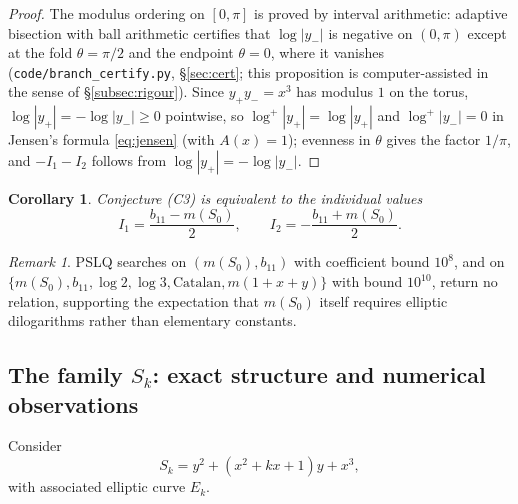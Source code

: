 \documentclass[11pt]{amsart}
\newtheorem{corollary}[theorem]{Corollary}
\theoremstyle{definition}
\theoremstyle{remark}
\newtheorem{remark}[theorem]{Remark}
\begin{document}
\begin{proof}
The modulus ordering on $[0,\pi]$ is proved by interval arithmetic:
adaptive bisection with ball arithmetic certifies that $\log|y_-|$ is
negative on $(0,\pi)$ except at the fold $\theta=\pi/2$ and the endpoint
$\theta=0$, where it vanishes (\texttt{code/branch\_certify.py},
\S\ref{sec:cert}; this proposition is computer-assisted in the sense of
\S\ref{subsec:rigour}). Since
$y_+y_-=x^3$ has modulus $1$ on the torus, $\log|y_+|=-\log|y_-|\ge 0$
pointwise, so $\log^+|y_+|=\log|y_+|$ and $\log^+|y_-|=0$ in Jensen's
formula \eqref{eq:jensen} (with $A(x)=1$); evenness in $\theta$ gives the
factor $1/\pi$, and $-I_1-I_2$ follows from $\log|y_+|=-\log|y_-|$.
\end{proof}

\begin{corollary}
Conjecture \emph{(C3)} is equivalent to the individual values
\[
  I_1=\frac{b_{11}-m(S_0)}{2},\qquad I_2=-\frac{b_{11}+m(S_0)}{2}.
\]
\end{corollary}

\begin{remark}
PSLQ searches on $(m(S_0),b_{11})$ with coefficient bound $10^8$, and on
$\{m(S_0),b_{11},\log2,\log3,\mathrm{Catalan},m(1+x+y)\}$ with bound
$10^{10}$, return no relation, supporting the expectation that $m(S_0)$
itself requires elliptic dilogarithms rather than elementary constants.
\end{remark}

\subsection{The family \texorpdfstring{$S_k$}{Sk}: exact structure and
numerical observations}
\label{subsec:familythm}

Consider
\[
  S_k=y^2+(x^2+kx+1)y+x^3,
\]
with associated elliptic curve $E_k$.
\end{document}
